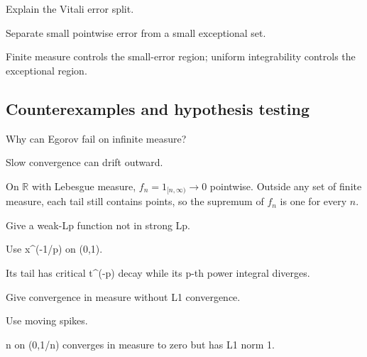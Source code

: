 \begin{exercise}\label{exr:iii08-expand-09}
Explain the Vitali error split.
\end{exercise}
\begin{hint}
Separate small pointwise error from a small exceptional set.
\end{hint}
\begin{solution}
Finite measure controls the small-error region; uniform integrability controls the exceptional region.
\end{solution}

\subsection*{Counterexamples and hypothesis testing}

\begin{exercise}\label{exr:iii08-expand-10}
Why can Egorov fail on infinite measure?
\end{exercise}
\begin{hint}
Slow convergence can drift outward.
\end{hint}
\begin{solution}
On $\mathbb R$ with Lebesgue measure, $f_n=1_{[n,\infty)}\to0$ pointwise. Outside any set of finite measure, each tail still contains points, so the supremum of $f_n$ is one for every $n$.
\end{solution}

\begin{exercise}\label{exr:iii08-expand-11}
Give a weak-Lp function not in strong Lp.
\end{exercise}
\begin{hint}
Use x\textasciicircum{}(-1/p) on (0,1).
\end{hint}
\begin{solution}
Its tail has critical t\textasciicircum{}(-p) decay while its p-th power integral diverges.
\end{solution}

\begin{exercise}\label{exr:iii08-expand-12}
Give convergence in measure without L1 convergence.
\end{exercise}
\begin{hint}
Use moving spikes.
\end{hint}
\begin{solution}
n on (0,1/n) converges in measure to zero but has L1 norm 1.
\end{solution}

